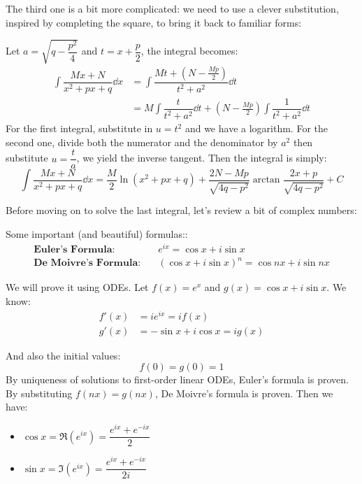 \documentclass[12pt]{article}
\begin{document}
    The third one is a bit more complicated: we need to use a clever substitution, inspired by completing the square, to bring it back to familiar forms:
    \par Let $a = \sqrt{q-\dfrac{p^2}{4}}$ and $t = x + \dfrac{p}{2}$, the integral becomes:
    \begin{align*}
        \int \dfrac{Mx+N}{x^2 + px + q}\dd x & =  \int \dfrac{Mt + (N - \frac{Mp}{2})}{t^2 + a^2} \dd t \\
        & = M \int \dfrac{t}{t^2 + a^2} \dd t +  \left(N-\frac{Mp}{2} \right) \int \dfrac{1}{t^2 + a^2} \dd t
    \end{align*}
    For the first integral, substitute in $u = t^2$ and we have a logarithm. For the second one, divide both the numerator and the denominator by $a^2$ then substitute $u = \dfrac{t}{a}$, we yield the inverse tangent. Then the integral is simply:
    \begin{equation*}
        \int \dfrac{Mx+N}{x^2 + px + q}\dd x = \dfrac{M}{2}\ln(x^2 + px+ q) + \dfrac{2N - Mp}{\sqrt{4q-p^2}}\arctan \dfrac{2x+p}{\sqrt{4q -p^2}} + C
    \end{equation*}
    \par Before moving on to solve the last integral, let's review a bit of complex numbers:
    \begin{concept}
    Some important (and beautiful) formulas::
        \begin{align*}
        \textbf{Euler's Formula:}\quad & e^{ix} = \cos x + i \sin x \\
        \textbf{De Moivre's Formula:} \quad & (\cos x + i\sin x)^n = \cos nx + i \sin nx
        \end{align*}
    \end{concept}
    We will prove it using ODEs. Let $f(x) = e^x$ and $g(x) = \cos x + i \sin x$. We know:
    \begin{align*}
        f'(x) & = ie^{ix} = if(x) \\
        g'(x) & = -\sin x + i\cos x = ig(x)
    \end{align*}
    \par And also the initial values:
    \begin{equation*}
        f(0) = g(0) = 1
    \end{equation*}
    By uniqueness of solutions to first-order linear ODEs, Euler's formula is proven. By substituting $f(nx) = g(nx)$, De Moivre's formula is proven. Then we have:
    \begin{insight}
    \begin{itemize}
        \item $\cos x = \Re(e^{ix}) = \dfrac{e^{ix} + e^{-ix}}{2}$
        \item $\sin x = \Im(e^{ix}) = \dfrac{e^{ix} + e^{-ix}}{2i}$
    \end{itemize}
    \end{insight}
\end{document}
